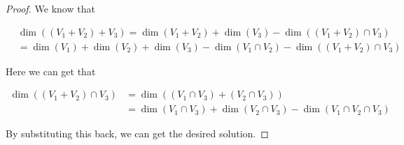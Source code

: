 \documentclass{extarticle}
\begin{document}
\begin{proof}
We know that 

\begin{align*}
&\dim ((V_1 + V_2) + V_3) = \dim(V_1 + V_2) + \dim(V_3) - \dim((V_1 + V_2)\cap V_3) \\ 
&= \dim (V_1) + \dim (V_2) + \dim (V_3) - \dim(V_1 \cap V_2) - \dim((V_1 + V_2)\cap V_3)
\end{align*}

Here we can get that 

\begin{align*}
    \dim((V_1 + V_2)\cap V_3) &= \dim((V_1 \cap V_3) + (V_2 \cap V_3)) \\ 
    &= \dim(V_1 \cap V_3) + \dim(V_2 \cap V_3) - \dim(V_1 \cap V_2 \cap V_3)
\end{align*}

By substituting this back, we can get the desired solution. 
\end{proof}
\end{document}
